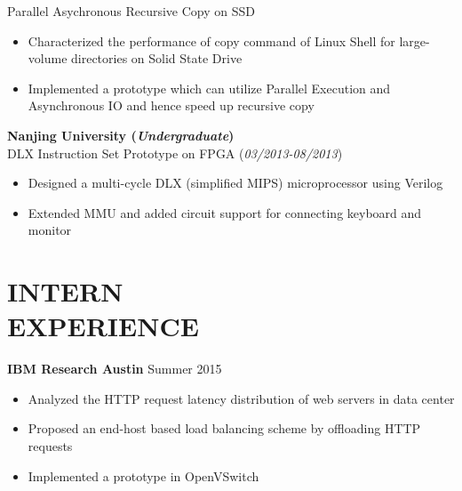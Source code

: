 \documentclass[margin, 9pt]{res} %
\begin{document}
\begin{resume}
\medskip
Parallel Asychronous Recursive Copy on SSD\\
\vspace*{-10pt}
\begin{itemize}[leftmargin=*] \itemsep -3pt
\vspace*{-5pt}
	\item Characterized the performance of copy command of Linux Shell for large-volume directories on Solid State Drive
	\item Implemented a prototype which can utilize Parallel Execution and Asynchronous IO and hence speed up recursive copy
\end{itemize}

\bigskip
{\large\textbf{Nanjing University (\textit{Undergraduate})}}\\

\vspace*{-7pt}
DLX Instruction Set Prototype on FPGA \hfill(\textit{03/2013-08/2013})\\
\vspace*{-10pt}
\begin{itemize}[leftmargin=*] \itemsep -3pt
\vspace*{-5pt}
	\item Designed a multi-cycle DLX (simplified MIPS) microprocessor using Verilog
	\item Extended MMU and added circuit support for connecting keyboard and monitor
\end{itemize}


\section{INTERN\\ EXPERIENCE} 

{\textbf{IBM Research Austin}} \hfill{Summer 2015}\\
\vspace*{-10pt}
\begin{itemize}[leftmargin=*] \itemsep -3pt
\vspace*{-5pt}
	\item Analyzed the HTTP request latency distribution of web servers in data center
	\item Proposed an end-host based load balancing scheme by offloading HTTP requests
	\item Implemented a prototype in OpenVSwitch
\end{itemize}


\end{resume}
\end{document}
